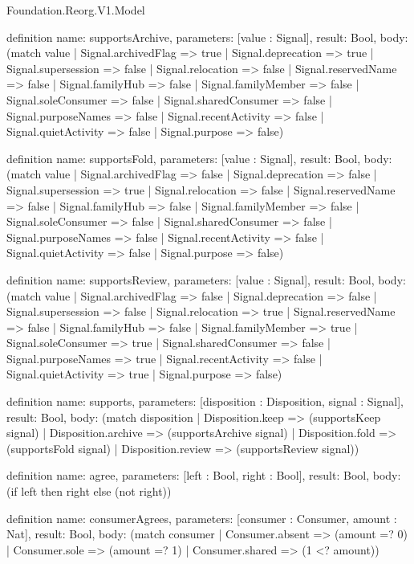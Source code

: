 \begin{lexlean}{Foundation.Reorg.V1.Model}
\begin{semanticmodule}
definition{
  name: supportsArchive,
  parameters: [value : Signal],
  result: Bool,
  body: (match value
    | Signal.archivedFlag => true
    | Signal.deprecation => true
    | Signal.supersession => false
    | Signal.relocation => false
    | Signal.reservedName => false
    | Signal.familyHub => false
    | Signal.familyMember => false
    | Signal.soleConsumer => false
    | Signal.sharedConsumer => false
    | Signal.purposeNames => false
    | Signal.recentActivity => false
    | Signal.quietActivity => false
    | Signal.purpose => false)
}

definition{
  name: supportsFold,
  parameters: [value : Signal],
  result: Bool,
  body: (match value
    | Signal.archivedFlag => false
    | Signal.deprecation => false
    | Signal.supersession => true
    | Signal.relocation => false
    | Signal.reservedName => false
    | Signal.familyHub => false
    | Signal.familyMember => false
    | Signal.soleConsumer => false
    | Signal.sharedConsumer => false
    | Signal.purposeNames => false
    | Signal.recentActivity => false
    | Signal.quietActivity => false
    | Signal.purpose => false)
}

definition{
  name: supportsReview,
  parameters: [value : Signal],
  result: Bool,
  body: (match value
    | Signal.archivedFlag => false
    | Signal.deprecation => false
    | Signal.supersession => false
    | Signal.relocation => true
    | Signal.reservedName => false
    | Signal.familyHub => false
    | Signal.familyMember => true
    | Signal.soleConsumer => true
    | Signal.sharedConsumer => false
    | Signal.purposeNames => true
    | Signal.recentActivity => false
    | Signal.quietActivity => true
    | Signal.purpose => false)
}

definition{
  name: supports,
  parameters: [disposition : Disposition, signal : Signal],
  result: Bool,
  body: (match disposition
    | Disposition.keep => (supportsKeep signal)
    | Disposition.archive => (supportsArchive signal)
    | Disposition.fold => (supportsFold signal)
    | Disposition.review => (supportsReview signal))
}

definition{
  name: agree,
  parameters: [left : Bool, right : Bool],
  result: Bool,
  body: (if left then right else (not right))
}

definition{
  name: consumerAgrees,
  parameters: [consumer : Consumer, amount : Nat],
  result: Bool,
  body: (match consumer
    | Consumer.absent => (amount =? 0)
    | Consumer.sole => (amount =? 1)
    | Consumer.shared => (1 <? amount))
}


\end{semanticmodule}
\end{lexlean}
